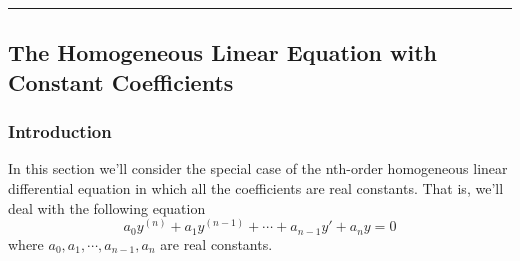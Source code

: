 \vspace{20pt}\rule{3in}{1pt}
\subsection{The Homogeneous Linear Equation with Constant Coefficients}


\subsubsection{Introduction}
In this section we'll consider the special case of the nth-order homogeneous linear differential equation in which all the coefficients are real constants. That is, we'll deal with the following equation
\begin{equation} \label{eq3}
    a_0y^{(n)} + a_1y^{(n-1)} + \cdots + a_{n-1}y' + a_ny = 0
\end{equation}
where $a_0, a_1, \cdots, a_{n-1}, a_n$ are real constants.


